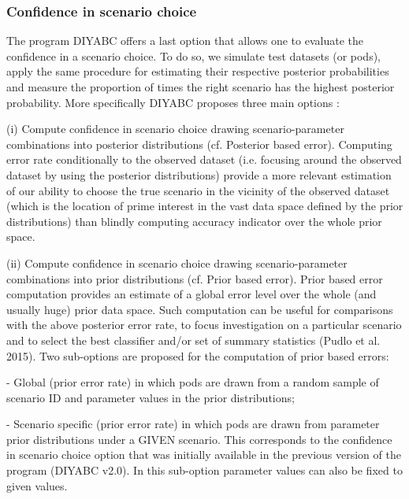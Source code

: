 \subsubsection{Confidence in scenario choice}

The program DIYABC offers a last option that allows one to evaluate
the confidence in a scenario choice. To do so, we simulate test datasets
(or pods), apply the same procedure for estimating their respective
posterior probabilities and measure the proportion of times the right
scenario has the highest posterior probability. More specifically
DIYABC proposes three main options :

(i) Compute confidence in scenario choice drawing scenario-parameter
combinations into posterior distributions (cf. Posterior based error).
Computing error rate conditionally to the observed dataset (i.e. focusing
around the observed dataset by using the posterior distributions)
provide a more relevant estimation of our ability to choose the true
scenario in the vicinity of the observed dataset (which is the location
of prime interest in the vast data space defined by the prior distributions)
than blindly computing accuracy indicator over the whole prior space.

(ii) Compute confidence in scenario choice drawing scenario-parameter
combinations into prior distributions (cf. Prior based error). Prior
based error computation provides an estimate of a global error level
over the whole (and usually huge) prior data space. Such computation
can be useful for comparisons with the above posterior error rate,
to focus investigation on a particular scenario and to select the
best classifier and/or set of summary statistics (Pudlo et al. 2015).
Two sub-options are proposed for the computation of prior based errors:

- Global (prior error rate) in which pods are drawn from a random
sample of scenario ID and parameter values in the prior distributions;

- Scenario specific (prior error rate) in which pods are drawn from
parameter prior distributions under a GIVEN scenario. This corresponds
to the confidence in scenario choice option that was initially available
in the previous version of the program (DIYABC v2.0). In this sub-option
parameter values can also be fixed to given values.

\clearpage{}
